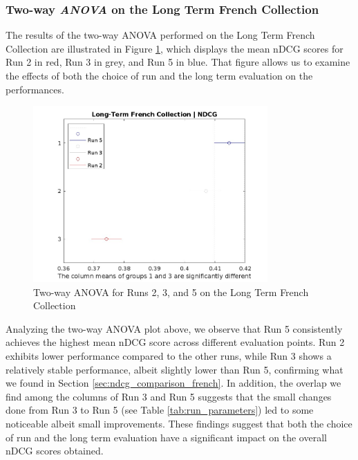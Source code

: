 \newpage
\enlargethispage{8\baselineskip}
\subsubsection{Two-way \textit{ANOVA} on the Long Term French Collection} \label{sec:anova_fr_lt}

The results of the two-way \ac{ANOVA} performed on the Long Term French Collection are illustrated in Figure \ref{fig:lt_anova_french}, which displays the mean \ac{nDCG} scores for Run 2 in red, Run 3 in grey, and Run 5 in blue.
That figure allows us to examine the effects of both the choice of run and the long term evaluation on the performances.

\begin{figure}[!h]
\centering
\includegraphics[width=0.8\textwidth]{figure/StatisticalAnalysis/ANOVA 2/ndcg-lt-fr.jpeg}
\caption{Two-way \ac{ANOVA} for Runs 2, 3, and 5 on the Long Term French Collection}
\label{fig:lt_anova_french}
\end{figure}

Analyzing the two-way \ac{ANOVA} plot above, we observe that Run 5 consistently achieves the highest mean \ac{nDCG} score across different evaluation points. 
Run 2 exhibits lower performance compared to the other runs, while Run 3 shows a relatively stable performance, albeit slightly lower than Run 5, confirming what we found in Section \ref{sec:ndcg_comparison_french}.
In addition, the overlap we find among the columns of Run 3 and Run 5 suggests that the small changes done from Run 3 to Run 5 (see Table \ref{tab:run_parameters}) led to some noticeable albeit small improvements. 
These findings suggest that both the choice of run and the long term evaluation have a significant impact on the overall \ac{nDCG} scores obtained.

